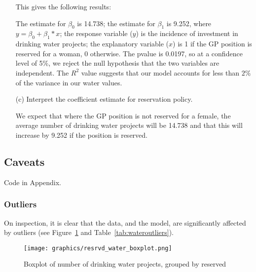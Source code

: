 \documentclass[12pt,letterpaper]{article}
\begin{document}
\begin{enumerate}
	  

	This gives the following results:
	
	

  The estimate for $\beta_0$ is 14.738; the estimate for $\beta_1$ is 9.252, where 
  $y = \beta_0 + \beta_1 * x $; the response variable ($y$) is the incidence of 
  investment in drinking water projects; the explanatory variable ($x$) is 1 if 
  the GP position is reserved for a woman, 0 otherwise.  The pvalue is 0.0197, so 
  at a confidence level of 5\%, we reject the null hypothesis that the two 
  variables are independent.  The $R^2$ value suggests that our model accounts 
  for less than $2\%$ of the variance in our water values.


	\item [(c)] Interpret the coefficient estimate for reservation policy. 

  We expect that where the GP position is not reserved for a female, the average
  number of drinking water projects will be 14.738 and that this will increase by 
  9.252 if the position is reserved.
  
  \end{enumerate}
  
  
\newpage
  \subsection*{Caveats}  
  
  Code in Appendix.
  
  \subsubsection*{Outliers}
	
	On inspection, it is clear that the data, and the model, are significantly affected
	by outliers (see Figure~\ref{fig:reserved_water_boxplot} and Table~\ref{tab:wateroutliers}).
	
  \begin{figure}[htb!]
	\caption{\footnotesize{Boxplot of number of drinking water projects, grouped by reserved}}
	\vspace{.5cm}
	\centering
	\label{fig:reserved_water_boxplot}
	\texttt{[image: graphics/resrvd\_water\_boxplot.png]}
  \end{figure}		
	
  
\end{document}
